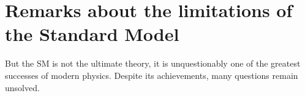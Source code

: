 








\section{Remarks about the limitations of the Standard Model}
\label{sec:chap1:Wrapup}

But the SM is not  
the ultimate theory, it is unquestionably one of the greatest successes of modern physics.
Despite its achievements, many questions remain unsolved.


